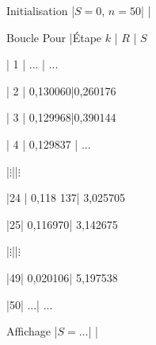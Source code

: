 \par
[table class=compact]
\par
Initialisation						|$S = 0$,   $n = 50 $|       |
\par
Boucle Pour						|Étape $k$ 			|  $R$ |  $S$
\par
|  1							|  ...  		| ...
\par
|  2							|   0,130060|0,260176
\par
|  3							|   0,129968|0,390144
\par
|  4							|   0,129837   | ...
\par
|${\vdots}$||${\vdots}$
\par
|24 |  0,118 137|   3,025705
\par
|25|   0,116970|   3,142675
\par
|${\vdots}$||${\vdots}$
\par
|49|   0,020106|   5,197538
\par
|50|  ...|  ...
\par
Affichage |$S = \ldots $| |
\par
[/table]
